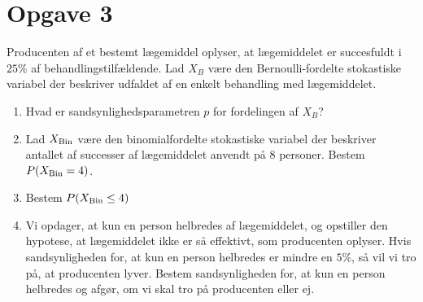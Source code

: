 \documentclass[12pt]{article}
\begin{document}
\section{Opgave 3}
Producenten af et bestemt lægemiddel oplyser, at lægemiddelet er succesfuldt i $25\%$ af behandlingstilfældende. Lad $X_B$ være den Bernoulli-fordelte stokastiske variabel der beskriver udfaldet af en enkelt behandling med lægemiddelet. 
\begin{enumerate}[label=\roman*)]
\item Hvad er sandsynlighedsparametren $p$ for fordelingen af $X_B$?
\item Lad $X_{\textnormal{Bin}}$ være den binomialfordelte stokastiske variabel der beskriver antallet af successer af lægemiddelet anvendt på $8$ personer. Bestem $P(X_{\textnormal{Bin}} = 4)$.
\item Bestem $P(X_{\textnormal{Bin}} \leq 4)$
\item Vi opdager, at kun en person helbredes af lægemiddelet, og opstiller den hypotese, at lægemiddelet ikke er så effektivt, som producenten oplyser. Hvis sandsynligheden for, at kun en person helbredes er mindre en $5\%$, så vil vi tro på, at producenten lyver. Bestem sandsynligheden for, at kun en person helbredes og afgør, om vi skal tro på producenten eller ej. 
\end{enumerate}
\end{document}
